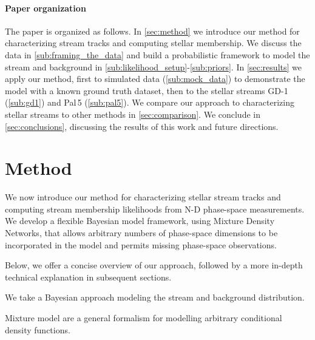 \documentclass[twocolumn]{aastex631}
\newcommand{\stream}[1]{#1}
\begin{document}
    \paragraph{Paper organization}

        The paper is organized as follows.
        In \autoref{sec:method} we introduce our method for characterizing stream tracks and computing stellar membership.
        We discuss the data in \autoref{sub:framing_the_data} and build a probabilistic framework to model the stream and background in \autoref{sub:likelihood_setup}-\autoref{sub:priors}.
        In \autoref{sec:results} we apply our method,
        first to simulated data (\autoref{sub:mock_data}) to demonstrate the model with a known ground truth dataset,
        then to the stellar streams \stream{GD-1} (\autoref{sub:gd1}) and \stream{Pal\,5} (\autoref{sub:pal5}).
        We compare our approach to characterizing stellar streams to other methods in \autoref{sec:comparison}.
        We conclude in \autoref{sec:conclusions}, discussing the results of this work and future directions.


\section{Method} \label{sec:method}

    We now introduce our method for characterizing stellar stream tracks and computing stream membership likelihoods from N-D phase-space measurements.
    We develop a flexible Bayesian model framework, using Mixture Density Networks, that allows arbitrary numbers of phase-space dimensions to be incorporated in the model and permits missing phase-space observations.


        Below, we offer a concise overview of our approach, followed by a more in-depth technical explanation in subsequent sections.

        We take a Bayesian approach modeling the stream and background distribution.
        
        Mixture model are a general formalism for modelling arbitrary conditional density functions.
        
\end{document}
